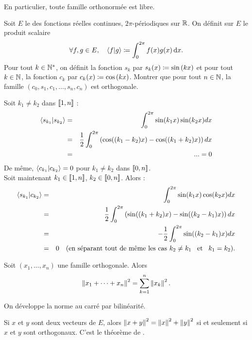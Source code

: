 \documentclass{magnolia}
\begin{document}
\begin{remarqueUnique}
\remarque En particulier, toute famille orthonormée est libre.
\end{remarqueUnique}

\begin{exoUnique}
\exo Soit $E$ le \Rev des fonctions réelles continues, $2\pi$-périodiques sur $\mathbb{R}$.
  On définit sur $E$ le produit scalaire
  \[\forall f,g\in E ,\quad \left\langle {f}\middle|{g}\right\rangle\coloneqq\int_{0}^{2\pi} f(x)g(x)\,\text{d}x.\]
  Pour tout $k\in{\mathbb{N}^*}$, on définit la fonction $s_k$ par
  $s_k(x)\coloneqq\sin\left(kx\right)$ et pour tout $k\in\mathbb{N}$, la fonction $c_k$ par
  $c_k(x)\coloneqq\cos\left(kx\right)$. Montrer que pour tout $n\in\mathbb{N}$, la famille
  $(c_0,s_1,c_1,\ldots,s_n,c_n)$ est orthogonale.
\end{exoUnique}

\begin{sol}
Soit $k_1\neq k_2$ dans $\left\llbracket 1,n\right\rrbracket$ :
\begin{eqnarray*}
\left\langle {s_{k_1}}\middle|{s_{k_2}}\right\rangle&=&\int_{0}^{2\pi}\sin(k_1 x)\sin(k_2 x) dx \\
&=& \frac{1}{2}\int_{0}^{2\pi}\left(\cos((k_1-k_2)x)-\cos((k_1+k_2)x)\right) dx\\
&=&...=0
\end{eqnarray*}
De même, $\left\langle {c_{k_1}}\middle|{c_{k_2}}\right\rangle=0$ pour $k_1\neq k_2$ dans $\left\llbracket 0,n\right\rrbracket$.\\
Soit maintenant $k_1\in \left\llbracket 1,n\right\rrbracket$, $k_2\in\left\llbracket 0,n\right\rrbracket$. Alors : 
\begin{eqnarray*}
\left\langle {s_{k_1}}\middle|{c_{k_2}}\right\rangle&=&\int_{0}^{2\pi}\sin(k_1 x)\cos(k_2 x) dx \\
&=& \frac{1}{2}\int_{0}^{2\pi}\left(\sin((k_1+k_2)x)-\sin((k_2-k_1)x)\right) dx\\
&=&-\frac{1}{2}\int_{0}^{2\pi}\sin((k_2-k_1)x) dx\\
&=&0 \quad (\text{en séparant tout de même les cas } k_2\neq k_1 \quad\!\text{et}\quad\! k_1=k_2).
\end{eqnarray*}

\end{sol}


\begin{proposition}[utile=-3, nom=\nom{Pythagore}]
Soit $(x_1,\ldots,x_n)$ une famille orthogonale. Alors
\[\left\|x_1+\cdots+x_n\right\|^2=\sum_{k=1}^n \left\|x_k\right\|^2.\]
\end{proposition}

\begin{preuve}
On développe la norme au carré par bilinéarité.
\end{preuve}

\begin{remarqueUnique}
\remarque Si $x$ et $y$ sont deux vecteurs de $E$, alors
  $\left\|x+y\right\|^2=\left\|x\right\|^2+\left\|y\right\|^2$ si et seulement si $x$ et $y$ sont
  orthogonaux. C'est le théorème de .
\end{remarqueUnique}
\end{document}
